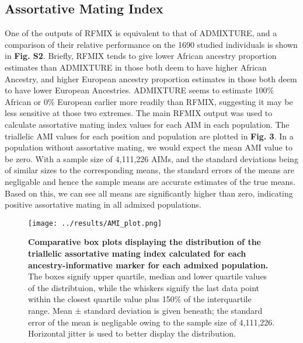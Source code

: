 \documentclass[11pt]{article}
\begin{document}
\subsection{Assortative Mating Index}





One of the outputs of RFMIX is equivalent to that of ADMIXTURE, and a comparison of their relative performance on the 1690 studied individuals is shown in \textbf{Fig. S2}. Briefly, RFMIX tends to give lower African ancestry proportion estimates than ADMIXTURE in those both deem to have higher African Ancestry, and higher European ancestry proportion estimates in those both deem to have lower European Ancestries. ADMIXTURE seems to estimate 100\% African or 0\% European earlier more readily than RFMIX, suggesting it may be less sensitive at those two extremes.
The main RFMIX output was used to calculate assortative mating index values for each AIM in each population. The triallelic AMI values for each position and population are plotted in \textbf{Fig. 3}. In a population without assortative mating, we would expect the mean AMI value to be zero. With a sample size of 4,111,226 AIMs, and the standard deviations being of similar sizes to the corresponding means, the standard errors of the means are negligable and hence the sample means are accurate estimates of the true means. Based on this, we can see all means are significantly higher than zero, indicating positive assortative mating in all admixed populations.



\vspace{3mm}
\begin{figure}[htb!]%
    \centering
    \texttt{[image: ../results/AMI\_plot.png]} 
    \vspace{.1cm}
    \caption{\textbf{
        Comparative box plots displaying the distribution of the triallelic assortative mating index calculated for each ancestry-informative marker for each admixed population.
    }
        The boxes signify upper quartile, median and lower quartile values of the distribtuion, while the whiskers signify the last data point within the closest quartile value plus 150\% of the interquartile range. Mean ± standard deviation is given beneath; the standard error of the mean is negligable owing to the sample size of 4,111,226. Horizontal jitter is used to better display the distribution.
    }
\end{figure}
\end{document}
